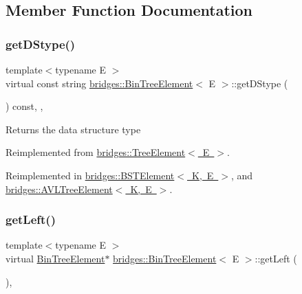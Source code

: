\subsection{Member Function Documentation}
\mbox{\label{classbridges_1_1_bin_tree_element_a0a154f68ef0a58715e598a6ef92b9e59}} 
\subsubsection{\texorpdfstring{get\+D\+Stype()}{getDStype()}}
{\footnotesize\ttfamily template$<$typename E $>$ \\
virtual const string \mbox{\hyperlink{classbridges_1_1_bin_tree_element}{bridges\+::\+Bin\+Tree\+Element}}$<$ E $>$\+::get\+D\+Stype (\begin{DoxyParamCaption}{ }\end{DoxyParamCaption}) const\hspace{0.3cm}{\ttfamily [inline]}, {\ttfamily [override]}, {\ttfamily [virtual]}}

\begin{DoxyReturn}{Returns}
the data structure type 
\end{DoxyReturn}


Reimplemented from \mbox{\hyperlink{classbridges_1_1_tree_element_a6b264d7391442a742edf96bdd5ee5442}{bridges\+::\+Tree\+Element$<$ E $>$}}.



Reimplemented in \mbox{\hyperlink{classbridges_1_1_b_s_t_element_af3843873c508c24f90b6e73a6f490bf8}{bridges\+::\+B\+S\+T\+Element$<$ K, E $>$}}, and \mbox{\hyperlink{classbridges_1_1_a_v_l_tree_element_a24c005f8e07a7a2682225cead3b7e364}{bridges\+::\+A\+V\+L\+Tree\+Element$<$ K, E $>$}}.

\mbox{\label{classbridges_1_1_bin_tree_element_a8367ce9c4eea814637edc2c56efbde25}} 
\subsubsection{\texorpdfstring{get\+Left()}{getLeft()}\hspace{0.1cm}{\footnotesize\ttfamily [1/2]}}
{\footnotesize\ttfamily template$<$typename E $>$ \\
virtual \mbox{\hyperlink{classbridges_1_1_bin_tree_element}{Bin\+Tree\+Element}}$\ast$ \mbox{\hyperlink{classbridges_1_1_bin_tree_element}{bridges\+::\+Bin\+Tree\+Element}}$<$ E $>$\+::get\+Left (\begin{DoxyParamCaption}{ }\end{DoxyParamCaption})\hspace{0.3cm}{\ttfamily [inline]}, {\ttfamily [virtual]}}

